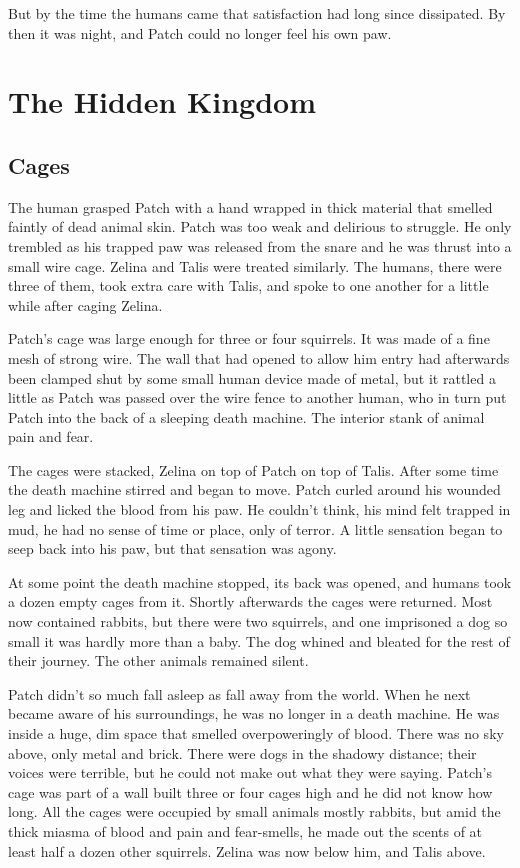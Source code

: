 \documentclass[12pt]{book}
\begin{document}
But by the time the humans came that satisfaction had long since dissipated. By then it was night, and Patch could no longer feel his own paw.


\chapter{The Hidden Kingdom}

\section{Cages}

The human grasped Patch with a hand wrapped in thick material that smelled faintly of dead animal skin. Patch was too weak and delirious to struggle. He only trembled as his trapped paw was released from the snare and he was thrust into a small wire cage. Zelina and Talis were treated similarly. The humans, there were three of them, took extra care with Talis, and spoke to one another for a little while after caging Zelina.

Patch's cage was large enough for three or four squirrels. It was made of a fine mesh of strong wire. The wall that had opened to allow him entry had afterwards been clamped shut by some small human device made of metal, but it rattled a little as Patch was passed over the wire fence to another human, who in turn put Patch into the back of a sleeping death machine. The interior stank of animal pain and fear.

The cages were stacked, Zelina on top of Patch on top of Talis. After some time the death machine stirred and began to move. Patch curled around his wounded leg and licked the blood from his paw. He couldn't think, his mind felt trapped in mud, he had no sense of time or place, only of terror. A little sensation began to seep back into his paw, but that sensation was agony.

At some point the death machine stopped, its back was opened, and humans took a dozen empty cages from it. Shortly afterwards the cages were returned. Most now contained rabbits, but there were two squirrels, and one imprisoned a dog so small it was hardly more than a baby. The dog whined and bleated for the rest of their journey. The other animals remained silent.

Patch didn't so much fall asleep as fall away from the world. When he next became aware of his surroundings, he was no longer in a death machine. He was inside a huge, dim space that smelled overpoweringly of blood. There was no sky above, only metal and brick. There were dogs in the shadowy distance; their voices were terrible, but he could not make out what they were saying. Patch's cage was part of a wall built three or four cages high and he did not know how long. All the cages were occupied by small animals %
mostly rabbits, but amid the thick miasma of blood and pain and fear-smells, he made out the scents of at least half a dozen other squirrels. Zelina was now below him, and Talis above.
\end{document}
